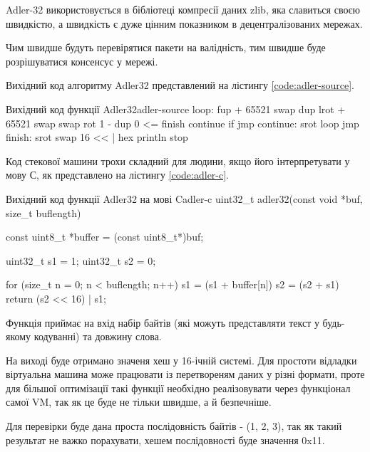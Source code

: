 \documentclass{lib/styles/default-style}
\begin{document}
    Adler-32 використовується в бібліотеці компресії даних zlib, яка славиться своєю швидкістю, а швидкість є дуже цінним показником
    в децентралізованих мережах.

    Чим швидше будуть перевірятися пакети на валідність, тим швидше буде розрішуватися консенсус у мережі.

    Вихідний код алгоритму Adler32 представлений на лістингу \ref{code:adler-source}.

    \begin{code}{Вихідний код функції Adler32}{adler-source}
        loop:
        fup
        +
        65521
        swap
        dup
        lrot
        +
        65521
        swap
        swap
        rot
        1
        -
        dup
        0
        <= finish continue if jmp
    continue:
        srot
        loop jmp
    finish:
        srot
        swap
        16
        <<
        |
        hex
        println
        stop\end{code}

    Код стекової машини трохи складний для людини, якщо його інтерпретувати у мову С, як представлено на лістингу \ref{code:adler-c}.

    \begin{code}{Вихідний код функції Adler32 на мові C}{adler-c}
        uint32_t adler32(const void *buf, size_t buflength) {
            const uint8_t *buffer = (const uint8_t*)buf;

            uint32_t s1 = 1;
            uint32_t s2 = 0;

            for (size_t n = 0; n < buflength; n++) {
                s1 = (s1 + buffer[n]) %
                s2 = (s2 + s1) %
            }     
            return (s2 << 16) | s1;
        }\end{code}

    Функція приймає на вхід набір байтів (які можуть представляти текст у будь-якому кодуванні) та довжину слова.
    
    На виході буде отримано значеня хеш у 16-ічній системі. Для простоти відладки віртуальна машина
    може працювати із перетвореням даних у різні формати, проте для більшої оптимізації такі функції необхідно реалізовувати
    через функціонал самої VM, так як це буде не тільки швидше, а й безпечніше.

    Для перевірки буде дана проста послідовність байтів - (1, 2, 3), так як такий результат не важко порахувати,
    хешем послідовності буде значення 0x11.
\end{document}
